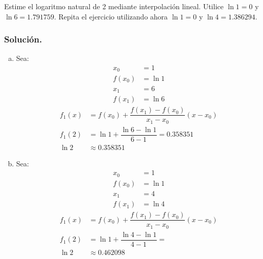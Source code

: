 \begin{exerciseT}
Estime el logaritmo natural de 2 mediante interpolación lineal. Utilice $\ln 1 = 0$ y $\ln 6 = 1.791759$. Repita el ejercicio utilizando 
ahora $\ln 1 = 0$ y $\ln 4 = 1.386294$.

\subsubsection*{Solución.} 

\begin{enumerate}[a)]
	\item Sea:
		\begin{align*}
			x_0 &= 1\\
			f(x_0) &= \ln 1\\
			x_1 &= 6 \\
			f(x_1) &= \ln 6
		\end{align*}
		\begin{align*}
			f_1(x) &= f(x_0) + \dfrac{f(x_1)-f(x_0)}{x_1-x_0}(x-x_0) \\
			f_1(2) &= \ln 1 + \dfrac{\ln 6 -\ln 1}{6-1} = 0.358351 \\
			\ln 2 &\approx 0.358351
		\end{align*}
		
	\item Sea:
		\begin{align*}
			x_0 &= 1\\
			f(x_0) &= \ln 1\\
			x_1 &= 4 \\
			f(x_1) &= \ln 4
		\end{align*}
		\begin{align*}
			f_1(x) &= f(x_0) + \dfrac{f(x_1)-f(x_0)}{x_1-x_0}(x-x_0) \\
			f_1(2) &= \ln 1 + \dfrac{\ln 4 -\ln 1}{4-1} =  \\
			\ln 2 &\approx 0.462098
		\end{align*}
\end{enumerate}
\end{exerciseT}

